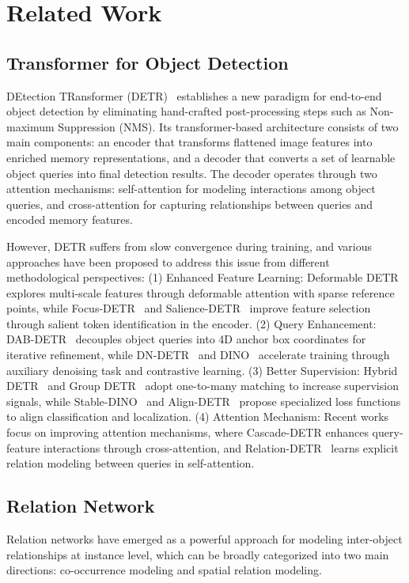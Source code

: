 \section{Related Work}
\label{sec:related-work}

\subsection{Transformer for Object Detection}
\label{sec:transformer-object-detection}
DEtection TRansformer (DETR)~\cite{carion2020end} establishes a new paradigm for end-to-end object detection by eliminating hand-crafted post-processing steps such as Non-maximum Suppression (NMS). Its transformer-based architecture consists of two main components: an encoder that transforms flattened image features into enriched memory representations, and a decoder that converts a set of learnable object queries into final detection results. The decoder operates through two attention mechanisms: self-attention for modeling interactions among object queries, and cross-attention for capturing relationships between queries and encoded memory features.

However, DETR suffers from slow convergence during training, and various approaches have been proposed to address this issue from different methodological perspectives: (1) Enhanced Feature Learning: Deformable DETR~\cite{zhu2020deformable} explores multi-scale features through deformable attention with sparse reference points, while Focus-DETR~\cite{zheng2023more} and Salience-DETR~\cite{hou2024salience} improve feature selection through salient token identification in the encoder. (2) Query Enhancement: DAB-DETR~\cite{liu2021dab} decouples object queries into 4D anchor box coordinates for iterative refinement, while DN-DETR~\cite{li2022dn} and DINO~\cite{zhang2022dino} accelerate training through auxiliary denoising task and contrastive learning. (3) Better Supervision: Hybrid DETR~\cite{zong2023detrs} and Group DETR~\cite{chen2023group} adopt one-to-many matching to increase supervision signals, while Stable-DINO~\cite{liu2023detection} and Align-DETR~\cite{cai2023align} propose specialized loss functions to align classification and localization. (4) Attention Mechanism: Recent works focus on improving attention mechanisms, where Cascade-DETR \cite{ye2023cascade} enhances query-feature interactions through cross-attention, and Relation-DETR~\cite{hou2024relation} learns explicit relation modeling between queries in self-attention.

\subsection{Relation Network}
\label{sec:relation-network}
Relation networks have emerged as a powerful approach for modeling inter-object relationships at instance level, which can be broadly categorized into two main directions: co-occurrence modeling and spatial relation modeling.

